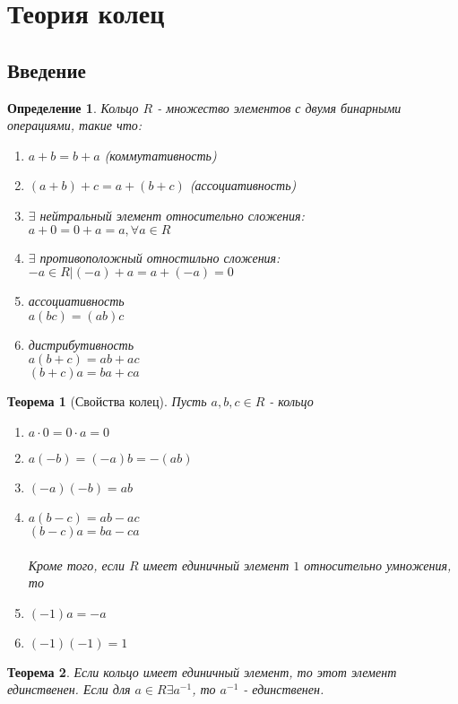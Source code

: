 \documentclass[10pt,a4paper]{article}
\newtheorem{definition}{Определение}
\newtheorem{theorem}{Теорема}
\begin{document}
	\setcounter{section}{1}
	\section{Теория колец}
		\subsection{Введение}
			\begin{definition}
				Кольцо $R$ - множество элементов с двумя бинарными операциями, такие что:
				\begin{enumerate}
					\item $a + b = b + a$ (коммутативность)
					\item $(a + b) + c = a + (b + c)$ (ассоциативность)
					\item $\exists$ нейтральный элемент относительно сложения:\\
					$a+0 = 0+a = a, \forall a \in R$
					\item $\exists$ противоположный отностильно сложения:\\
					$-a \in R \big| (-a) + a = a + (-a) = 0$
					\item ассоциативность\\
					$a(bc) = (ab)c$
					\item дистрибутивность\\
					$a(b+c) = ab + ac$\\
					$(b+c)a = ba + ca$
				\end{enumerate}
			\end{definition}
			\begin{theorem}[Свойства колец]
				Пусть $a, b, c \in R$ - кольцо
				\begin{enumerate}
					\item $a \cdot 0 = 0 \cdot a = 0$
					\item $a(-b) = (-a)b = -(ab)$
					\item $(-a)(-b) = ab$
					\item $a(b-c) = ab - ac$\\
					$(b-c)a = ba - ca$
					\\\\ Кроме того, если $R$ имеет единичный элемент $1$ относительно умножения, то
					\item $(-1)a = -a$
					\item $(-1)(-1) = 1$
				\end{enumerate}
			\end{theorem}
			\begin{theorem}
				Если кольцо имеет единичный элемент, то этот элемент единственен. Если для $a \in R \exists a^{-1}$, то $a^{-1}$ - единственен.
			\end{theorem}
\end{document}

